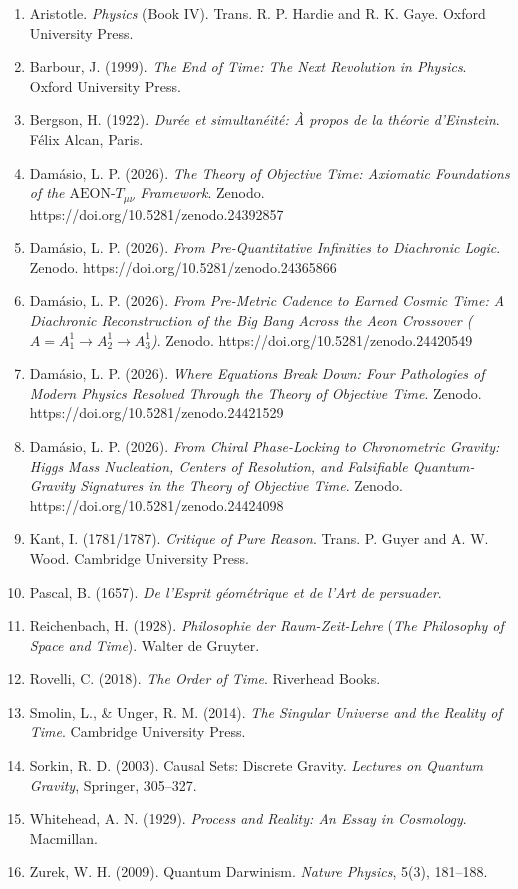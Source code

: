 \documentclass[
]{article}
\providecommand{\tightlist}{%
  \setlength{\itemsep}{0pt}\setlength{\parskip}{0pt}}
\begin{document}
\begin{enumerate}
\def\labelenumi{\arabic{enumi}.}
\tightlist
\item
  Aristotle. \emph{Physics} (Book IV). Trans. R. P. Hardie and R. K.
  Gaye. Oxford University Press.
\item
  Barbour, J. (1999). \emph{The End of Time: The Next Revolution in
  Physics}. Oxford University Press.
\item
  Bergson, H. (1922). \emph{Durée et simultanéité: À propos de la
  théorie d'Einstein}. Félix Alcan, Paris.
\item
  Damásio, L. P. (2026). \emph{The Theory of Objective Time: Axiomatic
  Foundations of the \(\text{AEON-}T_{\mu\nu}\) Framework}. Zenodo.
  https://doi.org/10.5281/zenodo.24392857
\item
  Damásio, L. P. (2026). \emph{From Pre-Quantitative Infinities to
  Diachronic Logic}. Zenodo. https://doi.org/10.5281/zenodo.24365866
\item
  Damásio, L. P. (2026). \emph{From Pre-Metric Cadence to Earned Cosmic
  Time: A Diachronic Reconstruction of the Big Bang Across the Aeon
  Crossover (\(A = A_1^1 \to A_2^1 \to A_3^1\))}. Zenodo.
  https://doi.org/10.5281/zenodo.24420549
\item
  Damásio, L. P. (2026). \emph{Where Equations Break Down: Four
  Pathologies of Modern Physics Resolved Through the Theory of Objective
  Time}. Zenodo. https://doi.org/10.5281/zenodo.24421529
\item
  Damásio, L. P. (2026). \emph{From Chiral Phase-Locking to Chronometric
  Gravity: Higgs Mass Nucleation, Centers of Resolution, and Falsifiable
  Quantum-Gravity Signatures in the Theory of Objective Time}. Zenodo.
  https://doi.org/10.5281/zenodo.24424098
\item
  Kant, I. (1781/1787). \emph{Critique of Pure Reason}. Trans. P. Guyer
  and A. W. Wood. Cambridge University Press.
\item
  Pascal, B. (1657). \emph{De l'Esprit géométrique et de l'Art de
  persuader}.
\item
  Reichenbach, H. (1928). \emph{Philosophie der Raum-Zeit-Lehre}
  (\emph{The Philosophy of Space and Time}). Walter de Gruyter.
\item
  Rovelli, C. (2018). \emph{The Order of Time}. Riverhead Books.
\item
  Smolin, L., \& Unger, R. M. (2014). \emph{The Singular Universe and
  the Reality of Time}. Cambridge University Press.
\item
  Sorkin, R. D. (2003). Causal Sets: Discrete Gravity. \emph{Lectures on
  Quantum Gravity}, Springer, 305--327.
\item
  Whitehead, A. N. (1929). \emph{Process and Reality: An Essay in
  Cosmology}. Macmillan.
\item
  Zurek, W. H. (2009). Quantum Darwinism. \emph{Nature Physics}, 5(3),
  181--188.
\end{enumerate}
\end{document}
